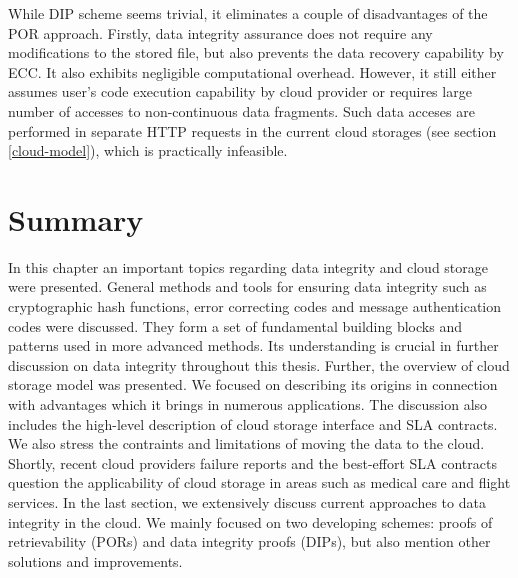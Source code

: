 While DIP scheme seems trivial, it eliminates a couple of disadvantages of the
POR approach. Firstly, data integrity assurance does not require any
modifications to the stored file, but also prevents the data recovery
capability by ECC. It also exhibits negligible computational overhead.
However, it still either assumes user's code execution capability by cloud
provider or requires large number of accesses to non-continuous data fragments.
Such data acceses are performed in separate HTTP requests in the current
cloud storages (see section \ref{cloud-model}), which is practically
infeasible.\\ 

\section{Summary}
In this chapter an important topics regarding data integrity and cloud storage were presented.
General methods and tools for ensuring data integrity such as cryptographic hash functions,
error correcting codes and message authentication codes were discussed. They form a set of
fundamental building blocks and patterns used in more advanced methods. Its understanding 
is crucial in further discussion on data integrity throughout this thesis. Further, the
overview of cloud storage model was presented. We focused on describing its origins in connection
with advantages which it brings in numerous applications. The discussion also includes the
high-level description of cloud storage interface and SLA contracts. We also stress the contraints
and limitations of moving the data to the cloud. Shortly, recent cloud providers failure reports
and the best-effort SLA contracts question the applicability of cloud storage in areas
such as medical care and flight services. In the last section, we extensively discuss current
approaches to data integrity in the cloud. We mainly focused on two developing schemes: proofs
of retrievability (PORs) and data integrity proofs (DIPs), but also mention other solutions and
improvements. 
